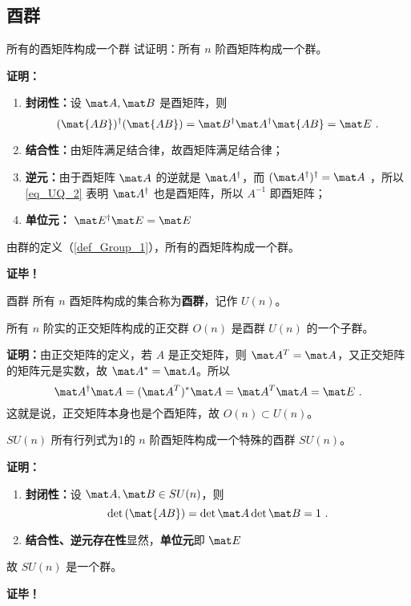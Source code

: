 \subsection{酉群}
\begin{example}{所有的酉矩阵构成一个群}
试证明：所有 $n$ 阶酉矩阵构成一个群。

\textbf{证明：}
\begin{enumerate}
\item \textbf{封闭性：}设 $\mat A,\mat B$ 是酉矩阵，则
\begin{equation}
(\mat{AB})^\dagger(\mat{AB})=\mat B^\dagger \mat A^\dagger\mat{AB}=\mat E~.
\end{equation}
\item \textbf{结合性：}由矩阵满足结合律，故酉矩阵满足结合律；
\item \textbf{逆元：}由于酉矩阵 $\mat A$ 的逆就是 $\mat A^\dagger$，而 $(\mat A^\dagger)^\dagger=\mat A$ ，所以\autoref{eq_UQ_2} 表明 $\mat A^\dagger$ 也是酉矩阵，所以 $A^{-1}$ 即酉矩阵；
\item \textbf{单位元：} $\mat E^\dagger\mat E=\mat E$
\end{enumerate}
由群的定义（\autoref{def_Group_1}），所有的酉矩阵构成一个群。

\textbf{证毕！}
\end{example}
\begin{definition}{酉群}
所有 $n$ 酉矩阵构成的集合称为\textbf{酉群}，记作 $U(n)$。
\end{definition}
\begin{theorem}{}
所有 $n$ 阶实的正交矩阵构成的正交群 $O(n)$ 是酉群 $U(n)$ 的一个子群。
\end{theorem}
\textbf{证明：}由正交矩阵的定义，若 $A$ 是正交矩阵，则 $\mat A^T=\mat A$，又正交矩阵的矩阵元是实数，故 $\mat A^*=\mat A$。所以
\begin{equation}
\mat A^\dagger\mat A=(\mat A^T)^*\mat A=\mat A^T\mat A=\mat E~.
\end{equation}
这就是说，正交矩阵本身也是个酉矩阵，故 $O(n)\subset U(n)$。
\begin{theorem}{$SU(n)$}
所有行列式为1的 $n$ 阶酉矩阵构成一个特殊的酉群 $SU(n)$。
\end{theorem}
\textbf{证明：}
\begin{enumerate}
\item \textbf{封闭性：}设 $\mat A,\mat B\in SU(n)$，则
\begin{equation}
\det{(\mat{AB})}=\det{\mat A}\det{\mat B}=1~.
\end{equation}
\item \textbf{结合性、逆元存在性}显然，\textbf{单位元}即 $\mat E$
\end{enumerate}
故 $SU(n)$ 是一个群。

\textbf{证毕！}
